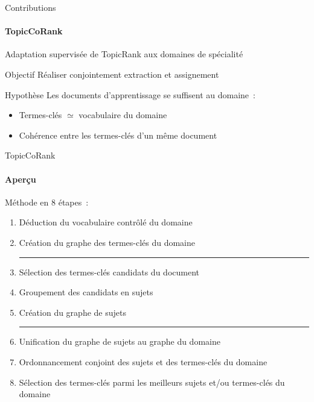\begin{frame}{Contributions}\framesubtitle{TopicCoRank}
  Adaptation supervisée de TopicRank aux domaines de spécialité

  \vspace{1em}

  \begin{block}{Objectif}
    Réaliser conjointement extraction et assignement
  \end{block}

  \vspace{1em}

  \begin{block}{Hypothèse}
    Les documents d'apprentissage se suffisent au domaine~:
    \begin{itemize}
      \item{Termes-clés $\simeq$ vocabulaire du domaine}
      \item{Cohérence entre les termes-clés d'un même document}
    \end{itemize}
  \end{block}
\end{frame}

\begin{frame}{TopicCoRank}\framesubtitle{Aperçu}
  Méthode en 8 étapes~:
  \begin{enumerate}
    \item{Déduction du vocabulaire contrôlé du domaine}
    \item{Création du graphe des termes-clés du domaine}
    \vspace{.75em}\hrule\vspace{.5em}
    \item{Sélection des termes-clés candidats du document}
    \item{Groupement des candidats en sujets}
    \item{Création du graphe de sujets}
    \vspace{.75em}\hrule\vspace{.5em}
    \item{Unification du graphe de sujets au graphe du domaine}
    \item{Ordonnancement conjoint des sujets et des termes-clés du domaine}
    \item{Sélection des termes-clés parmi les meilleurs sujets et/ou termes-clés
          du domaine}
  \end{enumerate}
\end{frame}

